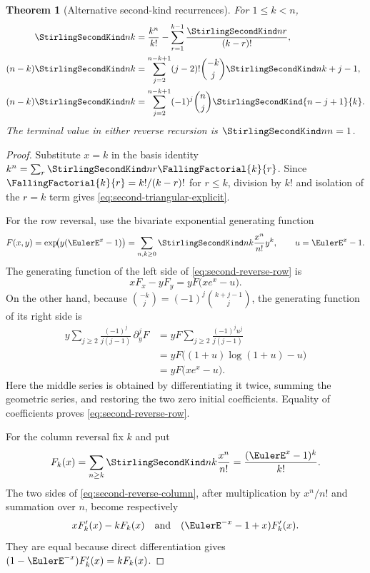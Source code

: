 \documentclass[11pt,a4paper,oneside,openany]{book}
\newtheorem{theorem}{Theorem}[chapter]
\theoremstyle{definition}
\theoremstyle{remark}
\begin{document}
\begin{theorem}[Alternative second-kind recurrences]
\label{thm:second-reverse-recurrences}
For $1\le k<n$,
\begin{align}
 \StirlingSecondKind nk
 &=\frac{k^n}{k!}-\sum_{r=1}^{k-1}\frac{\StirlingSecondKind nr}{(k-r)!},
 \label{eq:second-triangular-explicit}\\
 (n-k)\StirlingSecondKind nk
 &=\sum_{j=2}^{n-k+1}(j-2)!\binom{-k}{j}
   \StirlingSecondKind n{k+j-1},
 \label{eq:second-reverse-row}\\
 (n-k)\StirlingSecondKind nk
 &=\sum_{j=2}^{n-k+1}(-1)^j\binom nj
   \StirlingSecondKind{n-j+1}{k}.
 \label{eq:second-reverse-column}
\end{align}
The terminal value in either reverse recursion is $\StirlingSecondKind nn=1$.
\end{theorem}
\begin{proof}
Substitute $x=k$ in the basis identity
$k^n=\sum_r\StirlingSecondKind nr\FallingFactorial{k}{r}$.  Since
$\FallingFactorial{k}{r}=k!/(k-r)!$ for $r\le k$, division by $k!$ and isolation of the
$r=k$ term gives \eqref{eq:second-triangular-explicit}.

For the row reversal, use the bivariate exponential generating function
\[
 F(x,y)=\exp\!\bigl(y(\EulerE^x-1)\bigr)
 =\sum_{n,k\ge0}\StirlingSecondKind nk\frac{x^n}{n!}y^k,
 \qquad u=\EulerE^x-1.
\]
The generating function of the left side of
\eqref{eq:second-reverse-row} is
\[
 xF_x-yF_y=yF\bigl(xe^x-u\bigr).
\]
On the other hand, because
$\binom{-k}{j}=(-1)^j\binom{k+j-1}{j}$, the generating function of its right side is
\begin{align*}
 y\sum_{j\ge2}\frac{(-1)^j}{j(j-1)}\,\partial_y^jF
 &=yF\sum_{j\ge2}\frac{(-1)^ju^j}{j(j-1)}\\
 &=yF\bigl((1+u)\log(1+u)-u\bigr)\\
 &=yF\bigl(xe^x-u\bigr).
\end{align*}
Here the middle series is obtained by differentiating it twice, summing the
geometric series, and restoring the two zero initial coefficients.  Equality of
coefficients proves \eqref{eq:second-reverse-row}.

For the column reversal fix $k$ and put
\[
 F_k(x)=\sum_{n\ge k}\StirlingSecondKind nk\frac{x^n}{n!}
       =\frac{(\EulerE^x-1)^k}{k!}.
\]
The two sides of \eqref{eq:second-reverse-column}, after multiplication by
$x^n/n!$ and summation over $n$, become respectively
\[
 xF_k'(x)-kF_k(x)
 \quad\text{and}\quad
 (\EulerE^{-x}-1+x)F_k'(x).
\]
They are equal because direct differentiation gives
$(1-\EulerE^{-x})F_k'(x)=kF_k(x)$.
\end{proof}
\end{document}
